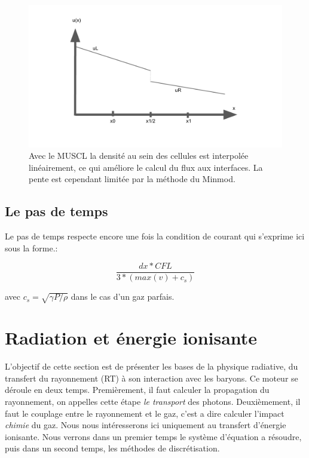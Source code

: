\begin{figure}
        \includegraphics[width=.95\linewidth]{img/02/MUSCL_minmod.pdf} 
        \caption[Méthode MUSCL]{Avec le \ac{MUSCL} la densité au sein des cellules est interpolée linéairement, ce qui améliore le calcul du flux aux interfaces.
        La pente est cependant limitée par la méthode du Minmod.
 		\label{fig:MUSCL}
 		}
\end{figure}



\subsection{Le pas de temps}

Le pas de temps respecte encore une fois la condition de courant qui s'exprime ici sous la forme.:

\begin{equation}
\frac{dx * CFL }{3*(max(v) + c_s)}
\end{equation}

avec $c_s = \sqrt{\gamma P/\rho}$ dans le cas d'un gaz parfais.


\clearpage
\section{Radiation et énergie ionisante}
\label{sec:rad_solver}


L'objectif de cette section est de présenter les bases de la physique radiative, du transfert du rayonnement (RT) à son interaction avec les baryons.
Ce moteur se déroule en deux temps.
Premièrement, il faut calculer la propagation du rayonnement, on appelles cette étape \textit{le transport} des photons.
Deuxièmement, il faut le couplage entre le rayonnement et le gaz, c'est a dire calculer l'impact \textit{chimie} du gaz.
Nous nous intéresserons ici uniquement au transfert d'énergie ionisante.
Nous verrons dans un premier temps le système d'équation a résoudre, puis dans un second temps, les méthodes de discrétisation.

